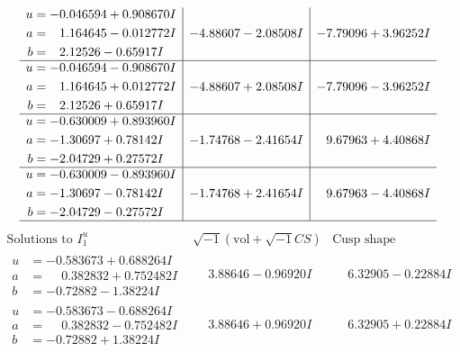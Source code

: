\documentclass[1p]{elsarticle_modified}
\theoremstyle{definition}
\newcommand{\I}{\sqrt{-1}}
\begin{document}
$$\begin{array}{c|c|c}
\begin{aligned}
u &= -0.046594 + 0.908670 I \\
a &= \phantom{-}1.164645 - 0.012772 I \\
b &= \phantom{-}2.12526 - 0.65917 I\end{aligned}
 & -4.88607 - 2.08508 I & -7.79096 + 3.96252 I \\ \hline\begin{aligned}
u &= -0.046594 - 0.908670 I \\
a &= \phantom{-}1.164645 + 0.012772 I \\
b &= \phantom{-}2.12526 + 0.65917 I\end{aligned}
 & -4.88607 + 2.08508 I & -7.79096 - 3.96252 I \\ \hline\begin{aligned}
u &= -0.630009 + 0.893960 I \\
a &= -1.30697 + 0.78142 I \\
b &= -2.04729 + 0.27572 I\end{aligned}
 & -1.74768 - 2.41654 I & \phantom{-}9.67963 + 4.40868 I \\ \hline\begin{aligned}
u &= -0.630009 - 0.893960 I \\
a &= -1.30697 - 0.78142 I \\
b &= -2.04729 - 0.27572 I\end{aligned}
 & -1.74768 + 2.41654 I & \phantom{-}9.67963 - 4.40868 I\\
 \hline 
 \end{array}$$\newpage$$\begin{array}{c|c|c}  
\text{Solutions to }I^u_{1}& \I (\text{vol} + \sqrt{-1}CS) & \text{Cusp shape}\\
 \hline 
\begin{aligned}
u &= -0.583673 + 0.688264 I \\
a &= \phantom{-}0.382832 + 0.752482 I \\
b &= -0.72882 - 1.38224 I\end{aligned}
 & \phantom{-}3.88646 - 0.96920 I & \phantom{-}6.32905 - 0.22884 I \\ \hline\begin{aligned}
u &= -0.583673 - 0.688264 I \\
a &= \phantom{-}0.382832 - 0.752482 I \\
b &= -0.72882 + 1.38224 I\end{aligned}
 & \phantom{-}3.88646 + 0.96920 I & \phantom{-}6.32905 + 0.22884 I \\ \hline\begin{aligned}

\end{aligned}
\end{array}$$
\end{document}
